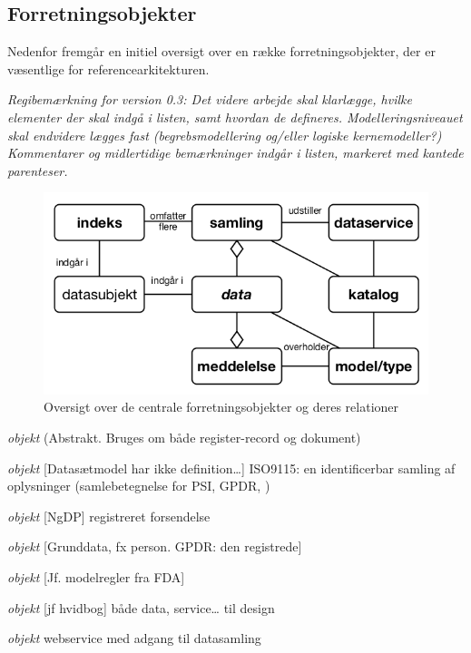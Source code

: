 \subsection{Forretningsobjekter}\label{forretningsobjekter}

Nedenfor fremgår en initiel oversigt over en række forretningsobjekter,
der er væsentlige for referencearkitekturen.

\emph{Regibemærkning for version 0.3: Det videre arbejde skal klarlægge,
hvilke elementer der skal indgå i listen, samt hvordan de defineres.
Modelleringsniveauet skal endvidere lægges fast (begrebsmodellering
og/eller logiske kernemodeller?) Kommentarer og midlertidige
bemærkninger indgår i listen, markeret med kantede parenteser.}

\begin{figure}
\centering
\includegraphics{figures/objekter.png}
\caption{Oversigt over de centrale forretningsobjekter og deres
relationer}
\end{figure}

\begin{description}
\tightlist
\item[data]
\emph{objekt} (Abstrakt. Bruges om både register-record og dokument)
\item[samling]
\emph{objekt} {[}Datasætmodel har ikke definition\ldots{}{]} ISO9115: en
identificerbar samling af oplysninger (samlebetegnelse for PSI, GPDR, )
\item[meddelelse]
\emph{objekt} {[}NgDP{]} registreret forsendelse
\item[datasubjekt]
\emph{objekt} {[}Grunddata, fx person. GPDR: den registrede{]}
\item[model/type]
\emph{objekt} {[}Jf. modelregler fra FDA{]}
\item[katalog]
\emph{objekt} {[}jf hvidbog{]} både data, service\ldots{} til design
\item[dataservice]
\emph{objekt} webservice med adgang til datasamling
\end{description}

